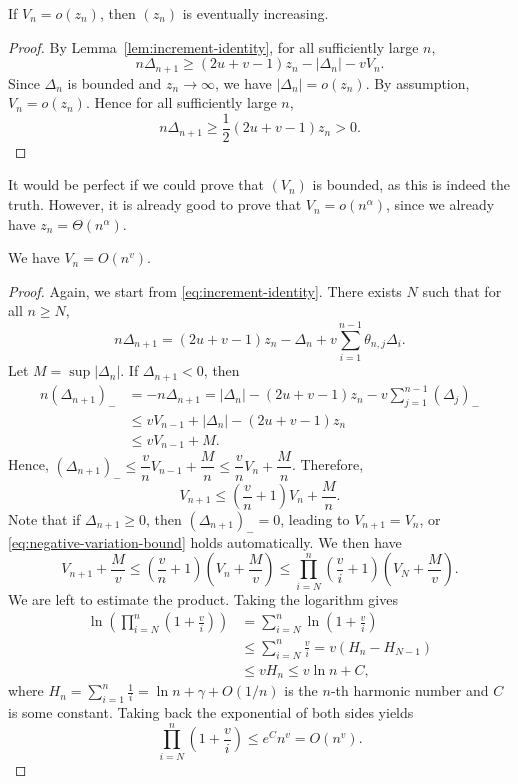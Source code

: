 \begin{lemma}
  If $V_n = o(z_n)$, then $(z_n)$ is eventually increasing.
\end{lemma}

\begin{proof}
  By Lemma~\ref{lem:increment-identity}, for all sufficiently large $n$,
  $$n\Delta_{n+1} \ge (2u+v-1)z_n-|\Delta_n|-vV_n.$$
  Since $\Delta_n$ is bounded and $z_n\to\infty$, we have $|\Delta_n|=o(z_n)$. By assumption, $V_n = o(z_n)$. Hence for all sufficiently large $n$,
  $$n\Delta_{n+1} \ge \dfrac{1}{2}(2u+v-1)z_n > 0.$$
\end{proof}

It would be perfect if we could prove that $(V_n)$ is bounded, as this is indeed the truth. However, it is already good to prove that $V_n = o(n^\alpha)$, since we already have $z_n = \Theta(n^\alpha)$.

\begin{lemma}
  We have $V_n = O(n^v)$.
\end{lemma}

\begin{proof}
  Again, we start from \eqref{eq:increment-identity}. There exists $N$ such that for all $n\ge N$,
  $$n\Delta_{n+1} = (2u+v-1)z_n - \Delta_n + v\sum_{i=1}^{n-1}\theta_{n,j}\Delta_i.$$
  Let $M = \sup |\Delta_n|$. If $\Delta_{n+1}<0$, then
  \begin{align*}
    n(\Delta_{n+1})_-
     & = -n\Delta_{n+1} = |\Delta_n| - (2u+v-1)z_n - v\sum_{j=1}^{n-1}(\Delta_j)_- \\
     & \le  vV_{n-1} + |\Delta_n| - (2u+v-1)z_n                                    \\
     & \le vV_{n-1} + M.
  \end{align*}
  Hence, $(\Delta_{n+1})_- \le \dfrac{v}{n}V_{n-1}+\dfrac{M}{n} \le \dfrac{v}{n}V_{n} + \dfrac{M}{n}$. Therefore,
  \begin{equation}
    \label{eq:negative-variation-bound}
    V_{n+1} \le \left(\dfrac{v}{n}+1\right)V_{n}+\dfrac{M}{n}.
  \end{equation}
  Note that if $\Delta_{n+1} \ge 0$, then $(\Delta_{n+1})_- = 0$, leading to $V_{n+1} = V_n$, or \eqref{eq:negative-variation-bound} holds automatically. We then have
  $$V_{n+1} + \dfrac{M}{v} \le \left(\dfrac{v}{n}+1\right)\left(V_{n} + \dfrac{M}{v}\right) \le \prod_{i=N}^n\left(\dfrac{v}{i}+1\right)\left(V_N + \dfrac{M}{v}\right).$$
  We are left to estimate the product. Taking the logarithm gives
  \begin{align*}
    \ln\left(\prod_{i=N}^n\left(1+\frac{v}{i}\right) \right)
     & = \sum_{i=N}^n\ln\left(1+\frac{v}{i}\right)     \\
     & \le \sum_{i=N}^n \frac{v}{i} = v(H_n - H_{N-1}) \\
     & \le vH_n \le v\ln n + C,
  \end{align*}
  where $H_n=\sum_{i=1}^n \frac{1}{i} = \ln n + \gamma + O(1/n)$ is the $n$-th harmonic number and $C$ is some constant. Taking back the exponential of both sides yields
  $$\prod_{i=N}^n \left( 1 + \frac{v}{i} \right) \le e^{C} n^v = O(n^v).$$
\end{proof}

